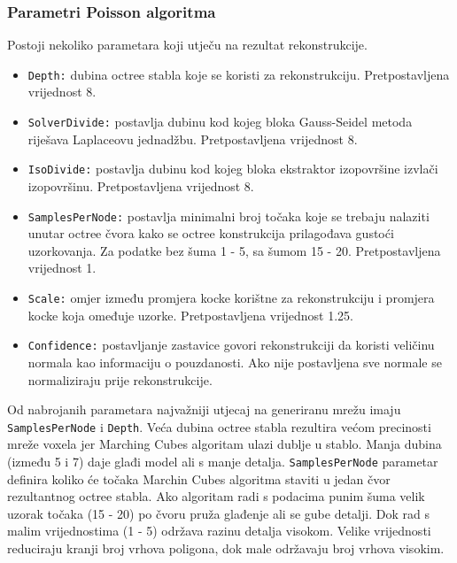 \subsubsection{Parametri Poisson algoritma} %
\label{ssub:Parametri Poisson algoritma}
Postoji nekoliko parametara koji utječu na rezultat rekonstrukcije.
\begin{itemize}
    \item \texttt{Depth:} dubina octree stabla koje se koristi za
        rekonstrukciju. Pretpostavljena vrijednost 8.
    \item \texttt{SolverDivide:} postavlja dubinu kod kojeg bloka
        Gauss-Seidel metoda riješava Laplaceovu jednadžbu. Pretpostavljena
        vrijednost 8.
    \item \texttt{IsoDivide:} postavlja dubinu kod kojeg bloka
        ekstraktor izopovršine izvlači izopovršinu. Pretpostavljena vrijednost
        8.
    \item \texttt{SamplesPerNode:} postavlja minimalni broj točaka koje
        se trebaju nalaziti unutar octree čvora kako se octree
        konstrukcija prilagođava gustoći uzorkovanja. Za podatke bez
        šuma 1 - 5, sa šumom 15 - 20. Pretpostavljena vrijednost 1.
    \item \texttt{Scale:} omjer između promjera kocke korištne za
        rekonstrukciju i promjera kocke koja omeđuje uzorke. Pretpostavljena
        vrijednost 1.25.
    \item \texttt{Confidence:} postavljanje zastavice govori
        rekonstrukciji da koristi veličinu normala kao informaciju o
        pouzdanosti. Ako nije postavljena sve normale se normaliziraju
        prije rekonstrukcije.
\end{itemize}

Od nabrojanih parametara najvažniji utjecaj na generiranu mrežu imaju
\texttt{SamplesPerNode} i \texttt{Depth}. Veća dubina octree stabla
rezultira većom precinosti mreže voxela jer Marching Cubes algoritam
ulazi dublje u stablo. Manja dubina (između 5 i 7) daje glađi model ali
s manje detalja. \texttt{SamplesPerNode} parametar definira koliko će
točaka Marchin Cubes algoritma staviti u jedan čvor rezultantnog octree
stabla. Ako algoritam radi s podacima punim šuma velik uzorak točaka (15
- 20) po čvoru pruža glađenje ali se gube detalji. Dok rad s malim
vrijednostima (1 - 5) održava razinu detalja visokom. Velike vrijednosti
reduciraju kranji broj vrhova poligona, dok male održavaju broj vrhova
visokim.



